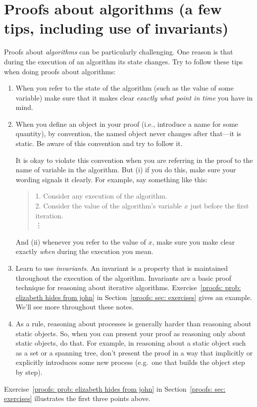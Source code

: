 \section{Proofs about algorithms (a few tips, including use of invariants)}\label{proofs: sec: algorithms}


Proofs about \emph{algorithms} can be particularly challenging.
One reason is that during the execution of an algorithm its state changes.
Try to follow these tips when doing proofs about algorithms:

\begin{enumerate}
\item When you refer to the state of the algorithm
  (such as the value of some variable)
  make sure that it makes clear \emph{exactly what point in time}
  you have in mind.  

\item When you define an object in your proof (i.e., introduce a name for some quantity),
  by convention, the named object never changes after that---it is static.
  Be aware of this convention and try to follow it.

  It is okay to violate this convention when you are referring in the proof
  to the name of variable in the algorithm.
  But (i) if you do this, make sure your wording signals it clearly.
  For example, say something like this:
  \begin{quote}
    1. Consider any execution of the algorithm. \\
    2. Consider the value of the algorithm's variable $x$ just before the first iteration.\\
    \vdots
  \end{quote}
  And (ii) whenever you refer to the value of $x$,
  make sure you make clear exactly \emph{when} during the execution you mean.

\item Learn to use \emph{invariants}.
  An invariant is a property that is maintained throughout the execution of the algorithm.
  Invariants are a basic proof technique for reasoning about iterative algorithms.
  Exercise~\ref{proofs: prob: elizabeth hides from john} in Section~\ref{proofs: sec: exercises} gives an example.
  We'll see more throughout these notes.

\item As a rule, reasoning about processes is generally harder than reasoning about static objects.
  So, when you can present your proof as reasoning only about static objects, do that.
  For example, in reasoning about a static object such as a set or a spanning tree,
  don't present the proof in a way that implicitly or explicitly introduces some new process
  (e.g.~one that builds the object step by step).
\end{enumerate}

Exercise~\ref{proofs: prob: elizabeth hides from john} in Section~\ref{proofs: sec: exercises}
illustrates the first three points above.

